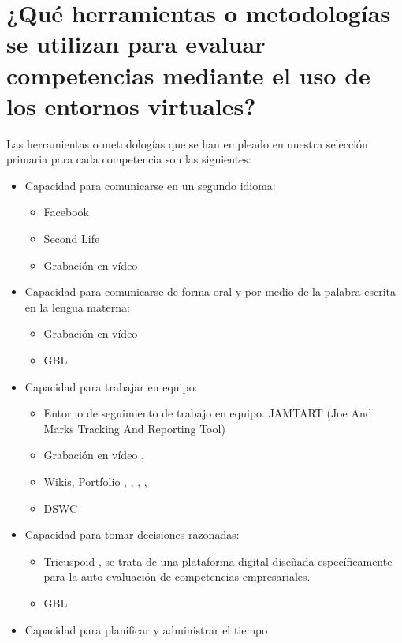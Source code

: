 \section{¿Qué herramientas o metodologías se utilizan para evaluar competencias mediante el uso de los entornos virtuales?}
Las herramientas o metodologías que se han empleado en nuestra selección primaria para cada competencia son las siguientes:
\begin{itemize}
\item Capacidad para comunicarse en un segundo idioma:
	\begin{itemize} 
	\item Facebook \cite{Shih:2011}
	\item Second Life \cite{MercedesRico:2013}
	\item Grabación en vídeo \cite{Masip-Alvarez:2013}
	\end{itemize}
\item Capacidad para comunicarse de forma oral y por medio de la palabra escrita en la lengua materna:
	\begin{itemize} 
	\item Grabación en vídeo \cite{Masip-Alvarez:2013}
	\item GBL \cite{Bedek:2011}
	\end{itemize}
\item Capacidad para trabajar en equipo:
	\begin{itemize} 
	\item Entorno de seguimiento de trabajo en equipo. JAMTART (Joe And Marks Tracking And Reporting Tool) \cite{McMahon:2007}
	\item Grabación en vídeo \cite{Masip-Alvarez:2013}, \cite{Martin-Cuadrado:2013}
	\item Wikis, Portfolio \cite{Piedra:2010}, \cite{Lim:2011}, \cite{Gil:2011}, \cite{Palomares:2011}, \cite{Velasco:2012}	
	\item DSWC \cite{Liao:2013}
	\end{itemize}
\item Capacidad para tomar decisiones razonadas:
	\begin{itemize} 
	\item Tricuspoid \cite{Achcaoucaou:2012}, se trata de una plataforma digital diseñada específicamente para la auto-evaluación de competencias empresariales.
	\item GBL \cite{Borrajo:2010}
	\end{itemize}
\item Capacidad para planificar y administrar el tiempo

\end{itemize}

